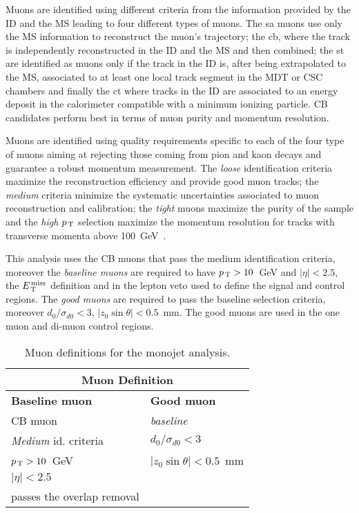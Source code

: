 Muons are identified using different criteria from the information provided by
the ID and the MS leading to four different types of muons. The \gls{sa} muons
use only the MS information to reconstruct the muon's trajectory; the \gls{cb},
where the track is independently reconstructed in the ID and the MS and then
combined; the \gls{st} are identified as muons only if the track in the ID is,
after being extrapolated to the MS, associated to at least one local track
segment in the MDT or CSC chambers and finally the \gls{ct} where tracks in the
ID are associated to an energy deposit in the calorimeter compatible with a
minimum ionizing particle. CB candidates perform best in terms of muon purity
and momentum resolution.

Muons are identified using quality requirements specific to each of the four
type of muons aiming at rejecting those coming from pion and kaon decays and
guarantee a robust momentum measurement. The \emph{loose} identification
criteria maximize the reconstruction efficiency and provide good muon tracks;
the \emph{medium} criteria minimize the systematic uncertainties associated to
muon reconstruction and calibration; the \emph{tight} muons maximize the purity
of the sample and the \emph{high $p_\mathrm{\, T}$} selection maximize the momentum
resolution for tracks with transverse momenta above 100~GeV~\cite{MUONS}.

This analysis uses the CB muons that pass the medium identification criteria,
moreover the \emph{baseline muons} are required to have $p_\mathrm{\, T} > 10$~GeV and
$|\eta| < 2.5$, the $E_\mathrm{\, T}^\mathrm{\, miss}$ definition and in the lepton veto used to define the
signal and control regions. The \emph{good muons} are required to pass the
baseline selection criteria, moreover $d_0 / \sigma_{d0} < 3$,
$|z_0 \sin \theta| < 0.5$~mm. The good muons are used in the one muon and
di-muon control regions.

\begin{table}[!th]
  \centering
  \begin{tabular}{ll}
    \toprule
    \multicolumn{2}{c}{Muon Definition} \\
    \midrule \midrule
    \textbf{Baseline muon} & \textbf{Good muon} \\
    \midrule
    CB muon & \emph{baseline} \\
    \emph{Medium} id. criteria & $d_0 / \sigma_{d0} < 3$ \\
    $p_\mathrm{\, T} > 10$~GeV & $|z_0 \sin \theta| < 0.5$~mm \\
    $|\eta| < 2.5$ & \\
    passes the overlap removal & \\
    \bottomrule
  \end{tabular}
  \caption{Muon definitions for the monojet analysis.}
  \label{tab:ele_def}
\end{table}
